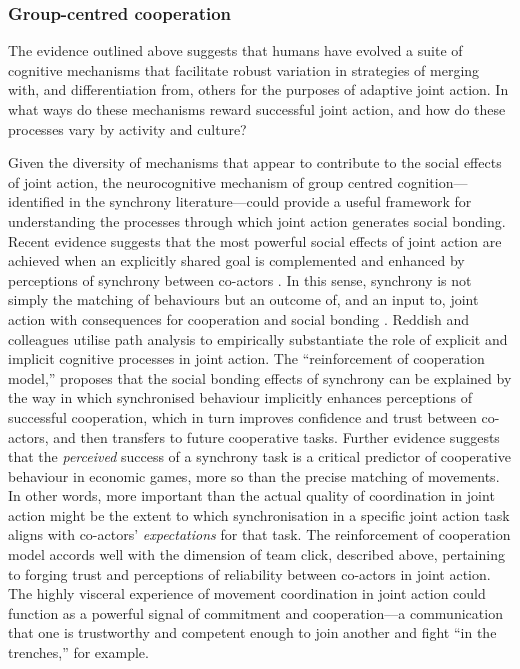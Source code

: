\begin{CJK}{UTF8}{gbsn}
\subsubsection{Group-centred cooperation}
The evidence outlined above suggests that humans have evolved a suite of cognitive mechanisms that facilitate robust variation in strategies of merging with, and differentiation from, others for the purposes of adaptive joint action. In what ways do these mechanisms reward successful joint action, and how do these processes vary by activity and culture?

Given the diversity of mechanisms that appear to contribute to the social effects of joint action, the neurocognitive mechanism of group centred cognition---identified in the synchrony literature---could provide a useful framework for understanding the processes through which joint action generates social bonding.  Recent evidence suggests that the most powerful social effects of joint action are achieved when an explicitly shared goal is complemented and enhanced by perceptions of synchrony between co-actors \citep{Frith2010,Reddish2013}.
In this sense, synchrony is not simply the matching of behaviours but an outcome of, and an input to, joint action with consequences for cooperation and social bonding \citep{Keller2014,Lumsden2012,Obhi2011}.
Reddish and colleagues \textcite{Reddish2013} utilise path analysis to empirically substantiate the role of explicit and implicit cognitive processes in joint action.
The ``reinforcement of cooperation model,'' proposes that the social bonding effects of synchrony can be explained by the way in which synchronised behaviour implicitly enhances perceptions of successful cooperation, which in turn improves confidence and trust between co-actors, and then transfers to future cooperative tasks.  Further evidence suggests that the \textit{perceived} success of a synchrony task is a critical predictor of cooperative behaviour in economic games, more so than the precise matching of movements\citep{Kurzban2001,Launay2013}.  In other words, more important than the actual quality of coordination in joint action might be the extent to which synchronisation in a specific joint action task aligns with co-actors' \textit{expectations} for that task.  The reinforcement of cooperation model accords well with the dimension of team click, described above, pertaining to forging trust and perceptions of reliability between co-actors in joint action.
The highly visceral experience of movement coordination in joint action could function as a powerful signal of commitment and cooperation---a communication that one is trustworthy and competent enough to join another and fight ``in the trenches,'' for example.


\end{CJK}
